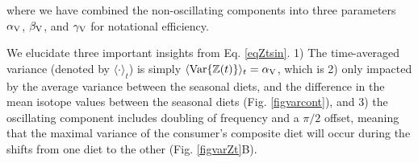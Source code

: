 \documentclass{frontiersSCNS}
\begin{document}
\noindent where we have combined the non-oscillating components into three parameters $\alpha_{\rm V}$, $\beta_{\rm V}$, and $\gamma_{\rm V}$ for notational efficiency.

We elucidate three important insights from Eq. \ref{eqZtsin}.
1) The time-averaged variance (denoted by $\langle \cdot
\rangle_t$) is simply $\langle {\rm Var}\{\mathbb{Z}(t)\} \rangle_t = \alpha_{\rm V}$, which is
2) only impacted by the average variance between the seasonal diets, and the difference in the mean isotope values between the seasonal diets (Fig. \ref{figvarcont}), and
3) the oscillating component includes doubling of frequency and a $\pi/2$ offset, meaning that the maximal variance of the consumer's composite diet will occur during the shifts from one diet to the other (Fig. \ref{figvarZt}B).
\end{document}
